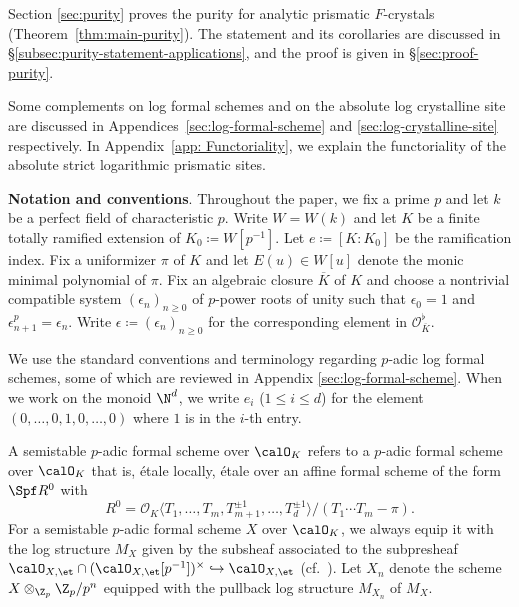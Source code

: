 Section \ref{sec:purity} proves the purity for analytic prismatic $F$-crystals (Theorem~\ref{thm:main-purity}). The statement and its corollaries are discussed in \S\ref{subsec:purity-statement-applications}, and the proof is given in \S\ref{sec:proof-purity}.

Some complements on log formal schemes and on the absolute log crystalline site are discussed in Appendices~\ref{sec:log-formal-scheme} and \ref{sec:log-crystalline-site} respectively. In Appendix~\ref{app: Functoriality}, we explain the functoriality of the absolute strict logarithmic prismatic sites.

\medskip
\noindent
\textbf{Notation and conventions}.
Throughout the paper, we fix a prime $p$ and let $k$ be a perfect field of characteristic $p$. Write $W=W(k)$ and let $K$ be a finite totally ramified extension of $K_0\coloneqq W[p^{-1}]$. Let $e \coloneqq [K : K_0]$ be the ramification index. Fix a uniformizer $\pi$ of $K$ and let $E(u)\in W[u]$ denote the monic minimal polynomial of $\pi$.
Fix an algebraic closure $\overline{K}$ of $K$ and choose a nontrivial compatible system $(\epsilon_n)_{n \geq 0}$ of $p$-power roots of unity such that $\epsilon_0 = 1$ and $\epsilon_{n+1}^p = \epsilon_n$. Write $\epsilon \coloneqq (\epsilon_n)_{n \geq 0}$ for the corresponding element in $\mathcal{O}_{\overline{K}}^{\flat}$.

We use the standard conventions and terminology regarding $p$-adic log formal schemes, some of which are reviewed in Appendix \ref{sec:log-formal-scheme}. When we work on the monoid $\N^d$, we write $e_i$ ($1\leq i\leq d$) for the element $(0,\ldots,0,1,0,\ldots,0)$ where $1$ is in the $i$-th entry.

A semistable $p$-adic formal scheme over $\calO_K$ refers to a $p$-adic formal scheme over $\calO_K$ that is, \'etale locally, \'etale over an affine formal scheme of the form $\Spf R^0$ with 
\[
R^0 = \mathcal{O}_K \langle T_1, \ldots, T_m, T_{m+1}^{\pm 1}, \ldots, T_d^{\pm 1}\rangle / (T_1\cdots T_m - \pi).
\]
For a semistable $p$-adic formal scheme $X$ over $\calO_K$, we always equip it with the log structure $M_X$ given by the subsheaf associated to the subpresheaf $\calO_{X,\et}\cap (\calO_{X,\et}[p^{-1}])^\times \hookrightarrow \calO_{X,\et}$ (cf.~\cite[1.6(2)]{Cesnavicius-Koshikawa}). Let $X_n$ denote the scheme $X\otimes_{\Z_p}\Z_p/p^n$ equipped with the pullback log structure $M_{X_n}$ of $M_X$.


